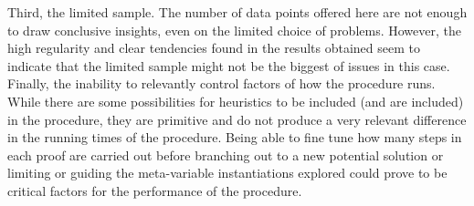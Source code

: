 \documentclass[12pt,a4paper]{article}
\begin{document}
Third, the limited sample. The number of data points offered here are not enough to draw conclusive insights, even on the limited choice of problems. However, the high regularity and clear tendencies found in the results obtained   seem to indicate that the limited sample might not be the biggest of issues in this case.\\

Finally, the inability to relevantly control factors of how the procedure runs. While there are some possibilities for heuristics to be included (and are included) in the procedure, they are primitive and do not produce a very relevant difference in the running times of the procedure. Being able to fine tune how many steps in each proof are carried out before branching out to a new potential solution or limiting or guiding the meta-variable instantiations explored could prove to be critical factors for the performance of the procedure.\\
\end{document}
